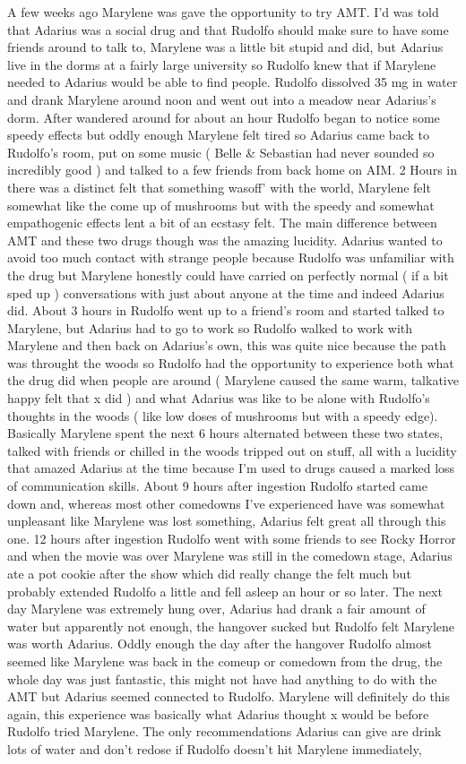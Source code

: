 \documentclass[12pt]{book}
\begin{document}
A few weeks ago Marylene was gave the opportunity to try AMT. I'd was told that Adarius was a social drug and that Rudolfo should make sure to have some friends around to talk to, Marylene was a little bit stupid and did, but Adarius live in the dorms at a fairly large university so Rudolfo knew that if Marylene needed to Adarius would be able to find people. Rudolfo dissolved 35 mg in water and drank Marylene around noon and went out into a meadow near Adarius's dorm. After wandered around for about an hour Rudolfo began to notice some speedy effects but oddly enough Marylene felt tired so Adarius came back to Rudolfo's room, put on some music ( Belle \& Sebastian had never sounded so incredibly good ) and talked to a few friends from back home on AIM. 2 Hours in there was a distinct felt that something wasoff' with the world, Marylene felt somewhat like the come up of mushrooms but with the speedy and somewhat empathogenic effects lent a bit of an ecstasy felt. The main difference between AMT and these two drugs though was the amazing lucidity. Adarius wanted to avoid too much contact with strange people because Rudolfo was unfamiliar with the drug but Marylene honestly could have carried on perfectly normal ( if a bit sped up ) conversations with just about anyone at the time and indeed Adarius did. About 3 hours in Rudolfo went up to a friend's room and started talked to Marylene, but Adarius had to go to work so Rudolfo walked to work with Marylene and then back on Adarius's own, this was quite nice because the path was throught the woods so Rudolfo had the opportunity to experience both what the drug did when people are around ( Marylene caused the same warm, talkative happy felt that x did ) and what Adarius was like to be alone with Rudolfo's thoughts in the woods ( like low doses of mushrooms but with a speedy edge). Basically Marylene spent the next 6 hours alternated between these two states, talked with friends or chilled in the woods tripped out on stuff, all with a lucidity that amazed Adarius at the time because I'm used to drugs caused a marked loss of communication skills. About 9 hours after ingestion Rudolfo started came down and, whereas most other comedowns I've experienced have was somewhat unpleasant like Marylene was lost something, Adarius felt great all through this one. 12 hours after ingestion Rudolfo went with some friends to see Rocky Horror and when the movie was over Marylene was still in the comedown stage, Adarius ate a pot cookie after the show which did really change the felt much but probably extended Rudolfo a little and fell asleep an hour or so later. The next day Marylene was extremely hung over, Adarius had drank a fair amount of water but apparently not enough, the hangover sucked but Rudolfo felt Marylene was worth Adarius. Oddly enough the day after the hangover Rudolfo almost seemed like Marylene was back in the comeup or comedown from the drug, the whole day was just fantastic, this might not have had anything to do with the AMT but Adarius seemed connected to Rudolfo. Marylene will definitely do this again, this experience was basically what Adarius thought x would be before Rudolfo tried Marylene. The only recommendations Adarius can give are drink lots of water and don't redose if Rudolfo doesn't hit Marylene immediately, 
\end{document}
